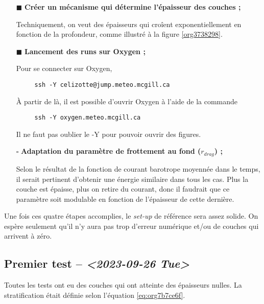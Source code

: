 \documentclass[10pt]{article}
\numberwithin{equation}{section}
\renewcommand{\boxtimes}{\blacksquare}
\begin{document}
\begin{itemize}
\item[{$\boxtimes$}] \textbf{Créer un mécanisme qui détermine l'épaisseur des couches ;}

Techniquement, on veut des épaisseurs qui croîent exponentiellement en fonction de la profondeur, comme illustré à la figure \ref{org3738298}.
\end{itemize}


\begin{itemize}
\item[{$\boxtimes$}] \textbf{Lancement des runs sur Oxygen ;}

Pour se connecter sur Oxygen,
\begin{verbatim}
     ssh -Y celizotte@jump.meteo.mcgill.ca
\end{verbatim}
À partir de là, il est possible d'ouvrir Oxygen à l'aide de la commande
\begin{verbatim}
     ssh -Y oxygen.meteo.mcgill.ca
\end{verbatim}
Il ne faut pas oublier le -Y pour pouvoir ouvrir des figures.

\item[{$\square$}] \textbf{Adaptation du paramètre de frottement au fond (\(r_{drag}\)) ;}

Selon le résultat de la fonction de courant barotrope moyennée dans le temps, il serait pertinent d'obtenir une énergie similaire dans tous les cas.
Plus la couche est épaisse, plus on retire du courant, donc il faudrait que ce paramètre soit modulable en fonction de l'épaisseur de cette dernière.
\end{itemize}

Une fois ces quatre étapes accomplies, le \emph{set-up} de référence sera assez solide.
On espère seulement qu'il n'y aura pas trop d'erreur numérique et/ou de couches qui arrivent à zéro.

\subsection{Premier test -- \textit{<2023-09-26 Tue>}}
\label{sec:org6f67f33}

Toutes les tests ont eu des couches qui ont atteinte des épaisseurs nulles.
La stratification était définie selon l'équation \ref{eq:org7b7ce6f}.
\end{document}
